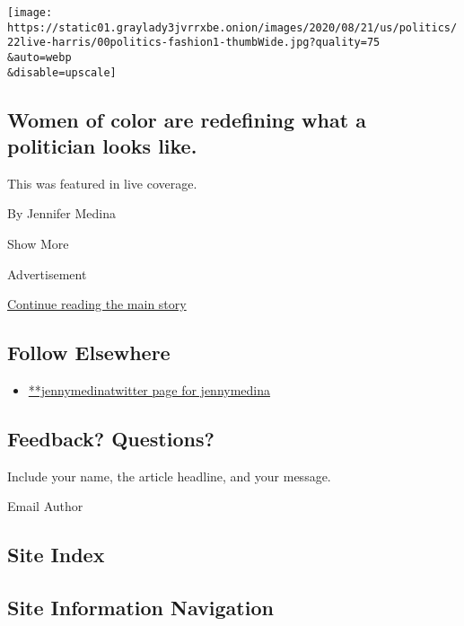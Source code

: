 \begin{enumerate}
  \texttt{[image: https://static01.graylady3jvrrxbe.onion/images/2020/08/21/us/politics/22live-harris/00politics-fashion1-thumbWide.jpg?quality=75\\\&auto=webp\\\&disable=upscale]}

  \hypertarget{women-of-color-are-redefining-what-a-politician-looks-like}{%
  \subsection{Women of color are redefining what a politician looks
  like.}\label{women-of-color-are-redefining-what-a-politician-looks-like}}

  This was featured in live coverage.

  By Jennifer Medina
\end{enumerate}

Show More

Advertisement

\protect\hyperlink{after-mid2}{Continue reading the main story}

\hypertarget{follow-elsewhere}{%
\subsection{Follow Elsewhere}\label{follow-elsewhere}}

\begin{itemize}
\tightlist
\item
  \href{https://twitter.com/jennymedina}{**jennymedinatwitter page for
  jennymedina}
\end{itemize}

\hypertarget{feedback-questions}{%
\subsection{Feedback? Questions?}\label{feedback-questions}}

Include your name, the article headline, and your message.

Email Author

\hypertarget{site-index}{%
\subsection{Site Index}\label{site-index}}

\hypertarget{site-information-navigation}{%
\subsection{Site Information
Navigation}\label{site-information-navigation}}

